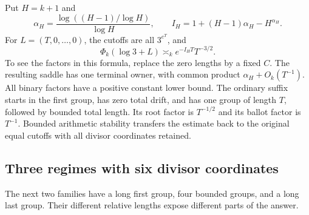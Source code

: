 Put \(H=k+1\) and
\begin{equation}
 \alpha_H=\frac{\log((H-1)/\log H)}{\log H},\qquad
 I_H=1+(H-1)\alpha_H-H^{\alpha_H}.
 \label{ex:equal-rate}
\end{equation}
For \(L=(T,0,\ldots,0)\), the cutoffs are all \(3^{e^T}\), and
\begin{equation}
 \Phi_k(\log3+L)\asymp_k e^{-I_HT}T^{-3/2}.
 \label{ex:equal-answer}
\end{equation}
To see the factors in this formula, replace the zero lengths by a fixed
\(C\).  The resulting saddle has one terminal owner, with common product
\(\alpha_H+O_k(T^{-1})\).  All binary factors have a positive constant
lower bound.  The ordinary suffix starts in the first group, has zero
total drift, and has one group of length \(T\), followed by bounded
total length.  Its root factor is \(T^{-1/2}\) and its ballot factor is
\(T^{-1}\).  Bounded arithmetic stability transfers the estimate back
to the original equal cutoffs with all divisor coordinates retained.

\subsection{Three regimes with six divisor coordinates}

The next two families have a long first group, four bounded groups, and
a long last group.  Their different relative lengths expose different
parts of the answer.

